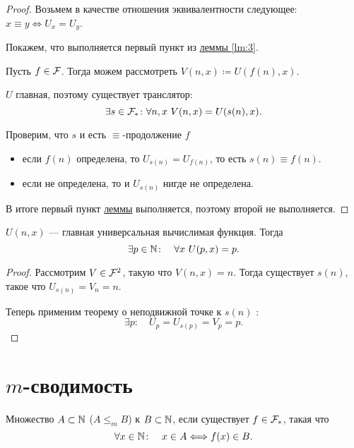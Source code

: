 \begin{proof}
    Возьмем в качестве отношения эквивалентности следующее: $ x \equiv y \Longleftrightarrow U_x = U_y $.

	Покажем, что выполняется первый пункт из \hyperref[lm:3]{леммы \ref{lm:3}}.

	Пусть $ f \in \mathcal{F}$. Тогда можем рассмотреть $ V(n, x) \coloneqq U(f(n), x)$. 

	$ U$ главная, поэтому существует транслятор:
	\[
		\exists s \in \mathcal{F}_{*} \colon  \forall n, x ~V(n, x) = U(s(n), x)
	.\] 

	Проверим, что $ s $ и есть $ \equiv $-продолжение $ f$
	\begin{itemize}
		\item если $ f(n)$ определена, то $ U_{s(n)} = U_{f(n)}$, то есть $ s(n) \equiv f(n)$.
		\item если не определена, то и $ U_{s(n)}$ нигде не определена.
	\end{itemize}

	В итоге первый пункт \hyperref[lm:3]{леммы} выполняется, поэтому второй не выполняется.
\end{proof}
\begin{cor}
	$ U(n, x)$ --- главная универсальная вычислимая функция. Тогда 
	\[
		\exists p \in \mathbb{N} \colon \quad \forall x  ~ U(p, x) = p
	.\] 
\end{cor}
\begin{proof}
	Рассмотрим $ V \in \mathcal{F}^{2}$, такую что $ V(n, x) = n$.
	Тогда существует $ s(n)$, такое что  $ U_{s(n)} = V_n = n$.

	Теперь применим теорему о неподвижной точке к  $ s(n)$ : 
	\[
		\exists p \colon \quad U_p = U_{s(p)} = V_p = p
	.\] 
\end{proof}

\section{$ m$-сводимость}
\begin{defn}[$ m$-сводимость]
	Множество $ A \subset \mathbb{N}$   ($ A \le_{m} B$) к $ B \subset \mathbb{N}$, если существует $ f \in \mathcal{F}_{*}$, такая что
	\[
		\forall x \in \mathbb{N} \colon\quad x \in A \Longleftrightarrow f(x) \in B
	.\] 
\end{defn}


